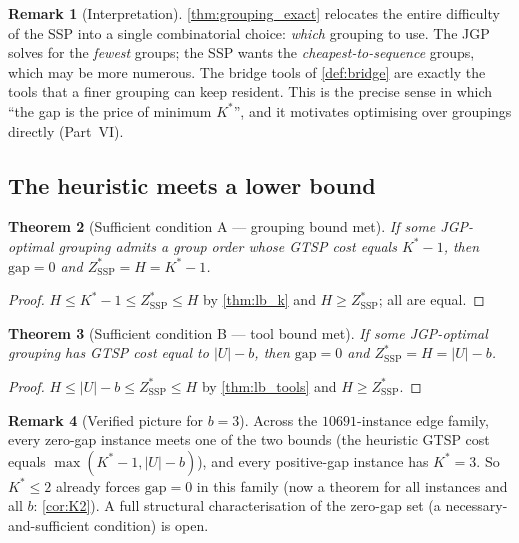 \documentclass[11pt,a4paper]{article}
\theoremstyle{plain}
\newtheorem{theorem}{Theorem}[section]
\theoremstyle{definition}
\newtheorem{remark}[theorem]{Remark}
\newcommand{\Kstar}{K^{*}}
\newcommand{\ZSSP}{Z_{\mathrm{SSP}}^{*}}
\begin{document}
\begin{remark}[Interpretation]
\cref{thm:grouping_exact} relocates the entire difficulty of the SSP into a single
combinatorial choice: \emph{which} grouping to use. The JGP solves for the \emph{fewest}
groups; the SSP wants the \emph{cheapest-to-sequence} groups, which may be more numerous.
The bridge tools of \cref{def:bridge} are exactly the tools that a finer grouping can keep
resident. This is the precise sense in which ``the gap is the price of minimum $\Kstar$'',
and it motivates optimising over groupings directly (Part~VI).
\end{remark}

\subsection{The heuristic meets a lower bound}

\begin{thmbox}
\begin{theorem}[Sufficient condition A --- grouping bound met]
\label{thm:suffA}
If some JGP-optimal grouping admits a group order whose GTSP cost equals $\Kstar-1$, then
$\mathrm{gap}=0$ and $\ZSSP=H=\Kstar-1$.
\end{theorem}
\end{thmbox}
\begin{proofbox}
\begin{proof}
$H\le \Kstar-1\le\ZSSP\le H$ by \cref{thm:lb_k} and $H\ge\ZSSP$; all are equal.
\end{proof}
\end{proofbox}

\begin{thmbox}
\begin{theorem}[Sufficient condition B --- tool bound met]
\label{thm:suffB}
If some JGP-optimal grouping has GTSP cost equal to $|U|-b$, then $\mathrm{gap}=0$ and
$\ZSSP=H=|U|-b$.
\end{theorem}
\end{thmbox}
\begin{proofbox}
\begin{proof}
$H\le |U|-b\le\ZSSP\le H$ by \cref{thm:lb_tools} and $H\ge\ZSSP$.
\end{proof}
\end{proofbox}

\begin{remark}[Verified picture for $b=3$]
Across the $10691$-instance edge family, every zero-gap instance meets one of the two
bounds (the heuristic GTSP cost equals $\max(\Kstar-1,|U|-b)$), and every positive-gap
instance has $\Kstar=3$. So $\Kstar\le2$ already forces $\mathrm{gap}=0$ in this family
(now a theorem for all instances and all $b$: \cref{cor:K2}).
A full structural characterisation of the zero-gap set (a necessary-and-sufficient
condition) is open.
\end{remark}
\end{document}
